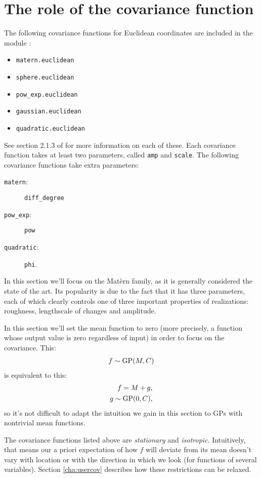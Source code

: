 \section{The role of the covariance function}\label{sec:cov}
The following covariance functions for Euclidean coordinates are included in the module :
\begin{itemize}
    \item \texttt{matern.euclidean}
    \item \texttt{sphere.euclidean}
    \item \texttt{pow_exp.euclidean}
    \item \texttt{gaussian.euclidean}
    \item \texttt{quadratic.euclidean}
\end{itemize}
See section 2.1.3 of  \cite{banerjee} for more information on each of these. Each covariance function takes at least two parameters, called \texttt{amp} and \texttt{scale}. The following covariance functions take extra parameters:
\begin{description}
    \item[\texttt{matern}:] \texttt{diff_degree}
    \item[\texttt{pow_exp}:] \texttt{pow}
    \item[\texttt{quadratic}:] \texttt{phi}.
\end{description}

In this section we'll focus on the Mat\`ern family, as it is generally considered the state of the art. Its popularity is due to the fact that it has three parameters, each of which clearly controls one of three important properties of realizations: roughness, lengthscale of changes and amplitude.

In this section we'll set the mean function to zero (more precisely, a function whose output value is zero regardless of input) in order to focus on the covariance. This:
\begin{eqnarray*}
    f\sim\textup{GP}(M,C)
\end{eqnarray*}
is equivalent to this:
\begin{eqnarray*}
    f = M + g, \\g\sim \textup{GP}(0,C),
\end{eqnarray*}
so it's not difficult to adapt the intuition we gain in this section to GPs with nontrivial mean functions.

The covariance functions listed above are \emph{stationary} and \emph{isotropic}. Intuitively, that means our a priori expectation of how $f$ will deviate from its mean doesn't vary with location or with the direction in which we look (for functions of several variables). Section \ref{cha:usercov} describes how these restrictions can be relaxed.

